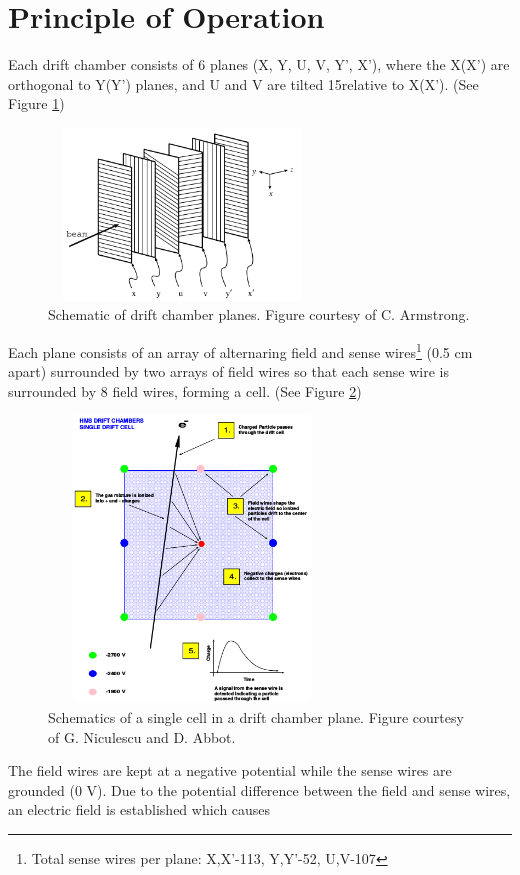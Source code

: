 \documentclass[journal, a4paper]{IEEEtran}
\begin{document}
\section{Principle of Operation}
Each drift chamber consists of 6 planes (X, Y, U, V, Y', X'), where the X(X') are orthogonal to Y(Y') planes, and U and V are
tilted 15\degree  relative to X(X'). (See Figure \ref{fig:wireplanes})
\begin{figure}[h]
  \centering
  \includegraphics[width=2.8in, height=1.8in]{wire_planes.png}
  \caption{Schematic of drift chamber planes. Figure courtesy of C. Armstrong.}
  \label{fig:wireplanes}
\end{figure}
Each plane consists of an array of alternaring field and sense wires\footnote{Total sense wires per plane: X,X'-113, Y,Y'-52, U,V-107} (0.5 cm apart) surrounded by
two arrays of field wires so that each sense wire is surrounded by 8 field wires, forming a cell. (See Figure \ref{fig:wire_cell})
\begin{figure}[h]
  \centering
  \includegraphics[width=3.0in, height=3.0in]{wire_cell.png}
  \caption{Schematics of a single cell in a drift chamber plane. Figure
  courtesy of G. Niculescu and D. Abbot.}
  \label{fig:wire_cell}
\end{figure}
The field wires are kept at a negative potential while the sense wires are grounded (0 V). Due to
the potential difference between the field and sense wires, an electric field is established which causes
\end{document}
